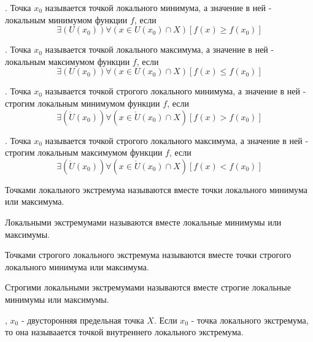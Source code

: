 \opred

\fXRx.
Точка $x_0$ называется точкой локального минимума, а значение в ней - локальным минимумом функции $f$, если
$$
\exists (U(x_0)) \forall(x \in U(x_0) \cap X)[f(x) \geq f(x_0)]
$$

\opred

\fXRx.
Точка $x_0$ называется точкой локального максимума, а значение в ней - локальным максимумом функции $f$, если
$$
\exists (U(x_0)) \forall(x \in U(x_0) \cap X)[f(x) \leq f(x_0)]
$$

\opred

\fXRx.
Точка $x_0$ называется точкой строгого локального минимума, а значение в ней - строгим локальным минимумом функции $f$, если
$$
\exists (\mathring{U}(x_0)) \forall(x \in \mathring{U}(x_0) \cap X)[f(x) > f(x_0)]
$$

\opred

\fXRx.
Точка $x_0$ называется точкой строгого локального максимума, а значение в ней - строгим локальным максимумом функции $f$, если
$$
\exists (\mathring{U}(x_0)) \forall(x \in \mathring{U}(x_0) \cap X)[f(x) < f(x_0)]
$$

\opred

Точками локального экстремума называются вместе точки локального минимума или максимума.

\opred

Локальными экстремумами называются вместе локальные минимумы или максимумы.

\opred

Точками строгого локального экстремума называются вместе точки строгого локального минимума или максимума.

\opred

Строгими локальными экстремумами называются вместе строгие локальные минимумы или максимумы.

\opred

\fXR, $x_0$ - двусторонняя предельная точка $X$.
Если $x_0$ - точка локального экстремума, то она называается точкой внутреннего локального экстремума.


